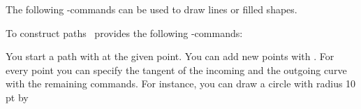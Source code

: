 The following \AL-commands can be used to
draw lines or filled shapes.
\begin{code}
   

   

   

   

   

   

   
\end{code}

To construct paths \ant\ provides the following \AL-commands\?:
\begin{code}
   

    

    

    

    

    

    

    

    

    

    

     
\end{code}
You start a path with  at the given point. You can add new
points with . For every point you can specify the tangent
of the incoming and the outgoing curve with the remaining commands.
For instance, you can draw a circle with radius 10\,pt by
